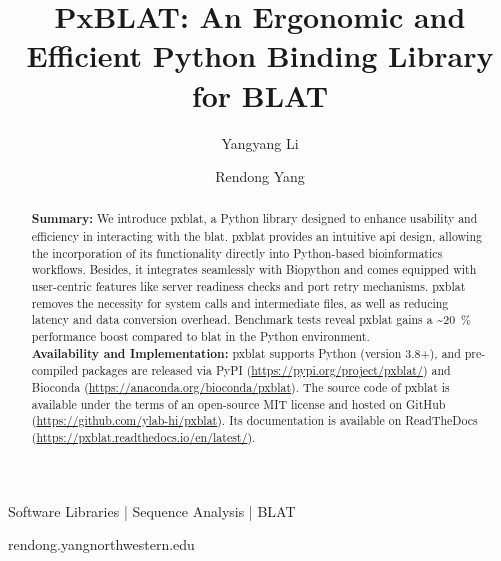 
\title{PxBLAT: An Ergonomic and Efficient Python Binding Library for BLAT}

\author[1]{Yangyang Li}
\author[1,\Letter]{Rendong Yang }
\date{}

\maketitle

\begin{abstract}
	\textbf{Summary:}
	We introduce \gls{pxblat}, a Python library designed to enhance usability and efficiency in interacting with the \gls{blat}.
	\gls{pxblat} provides an intuitive \gls{api} design, allowing the incorporation of its functionality directly into Python-based bioinformatics workflows.
	Besides, it integrates seamlessly with Biopython and comes equipped with user-centric features like server readiness checks and port retry mechanisms.
	\gls{pxblat} removes the necessity for system calls and intermediate files, as well as reducing latency and data conversion overhead.
	Benchmark tests reveal \gls{pxblat} gains a \textasciitilde\SI[per-mode=symbol,round-precision=0]{20}{\percent} performance boost compared to \gls{blat} in the Python environment. \\
	\textbf{Availability and Implementation:}
	\gls{pxblat} supports Python (version 3.8+), and pre-compiled packages are released via PyPI (\url{https://pypi.org/project/pxblat/}) and Bioconda (\url{https://anaconda.org/bioconda/pxblat}).
	The source code of \gls{pxblat}  is available under the terms of an open-source MIT license and hosted on GitHub (\url{https://github.com/ylab-hi/pxblat}).
	Its documentation is available on ReadTheDocs (\url{https://pxblat.readthedocs.io/en/latest/}).
\end{abstract}

\begin{keywords}
	Software Libraries |  Sequence Analysis | BLAT
\end{keywords}

\begin{corrauthor}
	rendong.yang\at northwestern.edu
\end{corrauthor}

